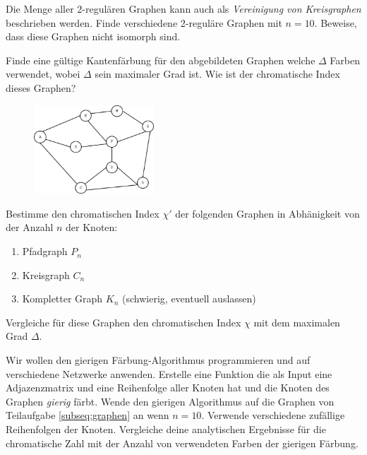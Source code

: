 \subexercise[%
  topic=2-regul\"are Graphen,
    ]
Die Menge aller 2-regul\"aren Graphen kann auch als \emph{Vereinigung von Kreisgraphen} beschrieben werden. Finde verschiedene 2-regul\"are Graphen mit $n=10$. 
Beweise, dass diese Graphen nicht isomorph sind.
\clearpage 
\exercise[%
  topic = Kantenf\"arbung 
    ]

\subexercise[%
  topic=Kantenf\"arbung eines Graphen,
    ]

Finde eine g\"ultige Kantenf\"arbung f\"ur den abgebildeten Graphen welche $\Delta$ Farben verwendet, wobei $\Delta$ sein maximaler Grad ist. Wie ist der chromatische Index dieses Graphen?

\begin{figure}[h]
\includegraphics[width=0.4\textwidth]{graph_colouring.eps}
\end{figure}

\subexercise[%
  topic=Kantenf\"arbung bestimmter Graphen,
    ]
Bestimme den chromatischen Index $\chi'$ der folgenden Graphen in Abh\"anigkeit von der Anzahl $n$ der Knoten:

\begin{enumerate}
\item Pfadgraph $P_n$
\item Kreisgraph $C_n$
\item Kompletter Graph $K_n$ (schwierig, eventuell auslassen)
\end{enumerate}

Vergleiche f\"ur diese Graphen den chromatischen Index $\chi$ mit dem maximalen Grad $\Delta$.


\exercise[%
  topic = Gierige F\"arbung Programmieren
    ]

Wir wollen den gierigen F\"arbung-Algorithmus programmieren und auf verschiedene Netzwerke anwenden.
\subexercise[%
  topic=Gierige F\"arbung,
    ]
		Erstelle eine Funktion die als Input eine Adjazenzmatrix und eine Reihenfolge aller Knoten hat und die Knoten des Graphen \emph{gierig} f\"arbt.
\subexercise[%
  topic=Gierige F\"arbung von bestimmten Graphen,
    ]
Wende den gierigen Algorithmus auf die Graphen von Teilaufgabe \ref{subseq:graphen} an wenn $n=10$. Verwende verschiedene zuf\"allige Reihenfolgen der Knoten. Vergleiche deine analytischen Ergebnisse f\"ur die chromatische Zahl mit der Anzahl von verwendeten Farben der gierigen F\"arbung.
		
